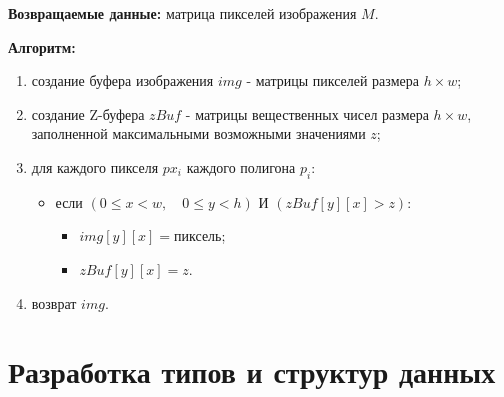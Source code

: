 \textbf{Возвращаемые данные:} матрица пикселей изображения $M$.

\textbf{Алгоритм:}

\begin{enumerate}
    \item создание буфера изображения $img$ - матрицы пикселей размера $h\times w$;
    \item создание Z-буфера $zBuf$ - матрицы вещественных чисел размера $h\times w$, заполненной максимальными возможными значениями $z$;
    \item для каждого пикселя $px_i$ каждого полигона $p_i$:
    \begin{itemize}
        \item если $(0 \leq x < w, \quad 0 \leq y < h)$ И $(zBuf[y][x] > z)$:
        \begin{itemize}
            \item $img[y][x] = \text{пиксель}$;
            \item $zBuf[y][x] = z$.
        \end{itemize}
    \end{itemize}
    \item возврат $img$.
\end{enumerate}

\section{Разработка типов и структур данных}

